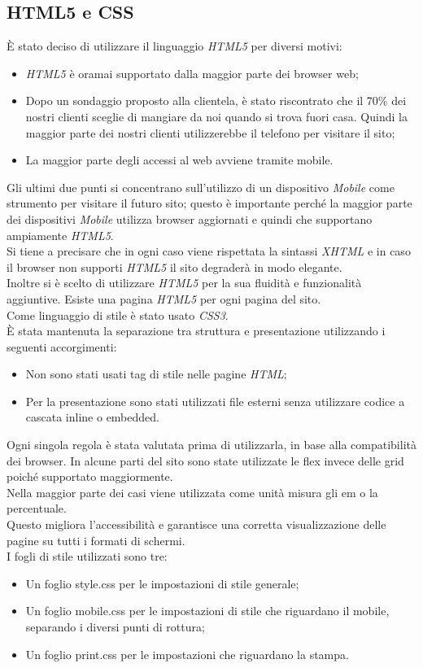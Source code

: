 \subsection{HTML5 e CSS}
È stato deciso di utilizzare il linguaggio \emph{HTML5} per diversi motivi:
\begin{itemize}
	\item \emph{HTML5} è oramai supportato dalla maggior parte dei browser web;
	\item Dopo un sondaggio proposto alla clientela, è stato riscontrato che il 70\% dei nostri clienti sceglie di mangiare da noi quando si trova fuori casa. 
	Quindi la maggior parte dei nostri clienti utilizzerebbe il telefono per visitare il sito;
	\item La maggior parte degli accessi al web avviene tramite mobile.
\end{itemize}
Gli ultimi due punti si concentrano sull'utilizzo di un dispositivo \emph{Mobile} come strumento per visitare il futuro sito; questo è importante perché la maggior parte dei dispositivi \emph{Mobile} utilizza browser aggiornati e quindi che supportano ampiamente \emph{HTML5}.\\
Si tiene a precisare che in ogni caso viene rispettata la sintassi \emph{XHTML} e in caso il browser non supporti \emph{HTML5} il sito degraderà in modo elegante.\\
Inoltre si è scelto di utilizzare \emph{HTML5} per la sua fluidità e funzionalità aggiuntive. %
Esiste una pagina \emph{HTML5} per ogni pagina del sito.\\ %
Come linguaggio di stile è stato usato \emph{CSS3}.\\
È stata mantenuta la separazione tra struttura e presentazione utilizzando i seguenti accorgimenti: 
\begin{itemize}
    \item Non sono stati usati tag di stile nelle pagine \emph{HTML};
    \item Per la presentazione sono stati utilizzati file esterni senza utilizzare codice a cascata inline o embedded.
\end{itemize}
Ogni singola regola è stata valutata prima di utilizzarla, in base alla compatibilità dei browser.
In alcune parti del sito sono state utilizzate le flex invece delle grid poiché supportato maggiormente.\\
Nella maggior parte dei casi viene utilizzata come unità misura gli em o la percentuale.\\
Questo migliora l'accessibilità e garantisce una corretta visualizzazione delle pagine su tutti i formati di schermi.\\
I fogli di stile utilizzati sono tre:
\begin{itemize}
	\item Un foglio style.css per le impostazioni di stile generale;
	\item Un foglio mobile.css per le impostazioni di stile che riguardano il mobile, separando i diversi punti di rottura; %
	\item Un foglio print.css per le impostazioni che riguardano la stampa.
\end{itemize}